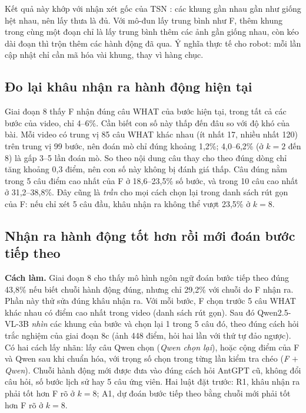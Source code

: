 \documentclass[a4paper,oneside]{report}
\begin{document}
Kết quả này khớp với nhận xét gốc của TSN \citep{wang2016tsn}: các khung gần nhau gần như giống hệt nhau, nên lấy thưa là đủ. Với mô-đun lấy trung bình như F, thêm khung trong cùng một đoạn chỉ là lấy trung bình thêm các ảnh gần giống nhau, còn kéo dài đoạn thì trộn thêm các hành động đã qua. Ý nghĩa thực tế cho robot: mỗi lần cập nhật chỉ cần mã hóa vài khung, thay vì hàng chục.

\subsection{Đo lại khâu nhận ra hành động hiện tại}
\label{sec:stage9b}

Giai đoạn 8 thấy F nhận đúng câu WHAT của bước hiện tại, trong tất cả các bước của video, chỉ 4--6\%. Cần biết con số này thấp đến đâu so với độ khó của bài. Mỗi video có trung vị 85 câu WHAT khác nhau (ít nhất 17, nhiều nhất 120) trên trung vị 99 bước, nên đoán mò chỉ đúng khoảng 1,2\%; 4,0--6,2\% (ở $k=2$ đến 8) là gấp 3--5 lần đoán mò. So theo nội dung câu thay cho theo đúng dòng chỉ tăng khoảng 0,3 điểm, nên con số này không bị đánh giá thấp. Câu đúng nằm trong 5 câu điểm cao nhất của F ở 18,6--23,5\% số bước, và trong 10 câu cao nhất ở 31,2--38,8\%. Đây cũng là \textit{trần} cho mọi cách chọn lại trong danh sách rút gọn của F: nếu chỉ xét 5 câu đầu, khâu nhận ra không thể vượt 23,5\% ở $k=8$.

\subsection{Nhận ra hành động tốt hơn rồi mới đoán bước tiếp theo}
\label{sec:stage9c}

\textbf{Cách làm.} Giai đoạn 8 cho thấy mô hình ngôn ngữ đoán bước tiếp theo đúng 43,8\% nếu biết chuỗi hành động đúng, nhưng chỉ 29,2\% với chuỗi do F nhận ra. Phần này thử sửa đúng khâu nhận ra. Với mỗi bước, F chọn trước 5 câu WHAT khác nhau có điểm cao nhất trong video (danh sách rút gọn). Sau đó Qwen2.5-VL-3B \textit{nhìn} các khung của bước và chọn lại 1 trong 5 câu đó, theo đúng cách hỏi trắc nghiệm của giai đoạn 8c (ảnh 448 điểm, hỏi hai lần với thứ tự đảo ngược). Có hai cách lấy nhãn: lấy câu Qwen chọn (\textit{Qwen chọn lại}), hoặc cộng điểm của F và Qwen sau khi chuẩn hóa, với trọng số chọn trong từng lần kiểm tra chéo (\textit{F $+$ Qwen}). Chuỗi hành động mới được đưa vào đúng cách hỏi AntGPT cũ, không đổi câu hỏi, số bước lịch sử hay 5 câu ứng viên. Hai luật đặt trước: R1, khâu nhận ra phải tốt hơn F rõ ở $k=8$; A1, dự đoán bước tiếp theo bằng chuỗi mới phải tốt hơn F rõ ở $k=8$.
\end{document}
